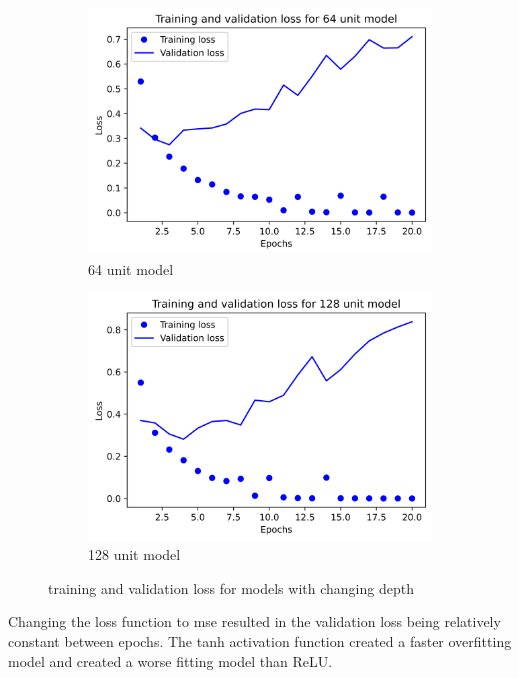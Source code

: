 \documentclass{article}
\begin{document}
\begin{figure}[H]
\begin{subfigure}{.5\textwidth}
            \includegraphics[width=\linewidth]{images/movies/4.png}
            \caption{64 unit model}
            \label{fig2:sfig3}
        \end{subfigure}
        \begin{subfigure}{.5\textwidth}
            \centering
            \includegraphics[width=\linewidth]{images/movies/5.png}
            \caption{128 unit model}
            \label{fig2:sfig4}
        \end{subfigure}
        \caption{training and validation loss for models with changing depth}
        \label{fig2:fig}
    \end{figure}
    Changing the loss function to mse resulted in 
    the validation loss being relatively constant between epochs. The tanh activation 
    function created a faster overfitting model and created a worse fitting model than ReLU.
\end{document}
